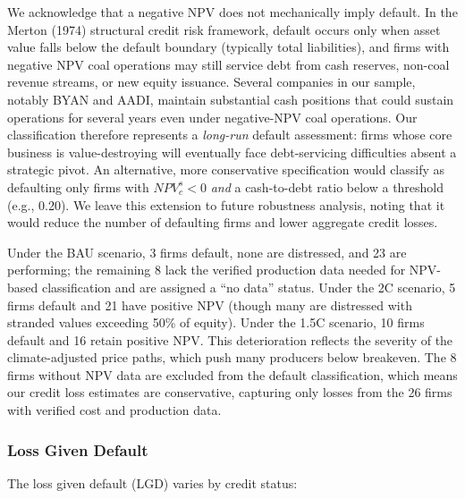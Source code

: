 We acknowledge that a negative NPV does not mechanically imply default. In the Merton (1974) structural credit risk framework, default occurs only when asset value falls below the default boundary (typically total liabilities), and firms with negative NPV coal operations may still service debt from cash reserves, non-coal revenue streams, or new equity issuance. Several companies in our sample, notably BYAN and AADI, maintain substantial cash positions that could sustain operations for several years even under negative-NPV coal operations. Our classification therefore represents a \textit{long-run} default assessment: firms whose core business is value-destroying will eventually face debt-servicing difficulties absent a strategic pivot. An alternative, more conservative specification would classify as defaulting only firms with $NPV_c^s < 0$ \textit{and} a cash-to-debt ratio below a threshold (e.g., 0.20). We leave this extension to future robustness analysis, noting that it would reduce the number of defaulting firms and lower aggregate credit losses.

Under the BAU scenario, 3 firms default, none are distressed, and 23 are performing; the remaining 8 lack the verified production data needed for NPV-based classification and are assigned a ``no data'' status. Under the 2\textdegree C scenario, 5 firms default and 21 have positive NPV (though many are distressed with stranded values exceeding 50\% of equity). Under the 1.5\textdegree C scenario, 10 firms default and 16 retain positive NPV. This deterioration reflects the severity of the climate-adjusted price paths, which push many producers below breakeven. The 8 firms without NPV data are excluded from the default classification, which means our credit loss estimates are conservative, capturing only losses from the 26 firms with verified cost and production data.

\subsubsection{Loss Given Default}

The loss given default (LGD) varies by credit status:

